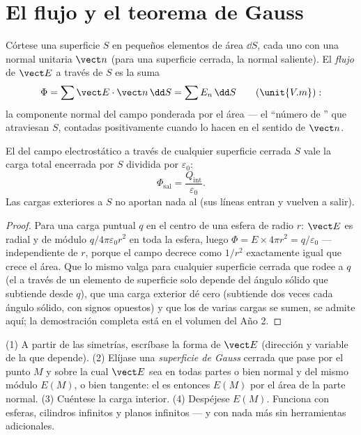 \section{El flujo y el teorema de Gauss}

\begin{definition}\label{def:b1:electrostatics-gauss:flux}
Córtese una superficie $S$ en pequeños elementos de área $\dd S$, cada uno
con una normal unitaria $\vect n$ (para una superficie cerrada, la normal
saliente). El \emph{flujo} de $\vect E$ a través de $S$ es la suma
\[
\Phi = \sum \vect E\cdot\vect n\,\dd S = \sum E_n\,\dd S \qquad (\unit{V.m}):
\]
la componente normal del campo ponderada por el área --- el ``número de
'' que atraviesan $S$, contadas positivamente cuando lo
hacen en el sentido de $\vect n$.
\end{definition}

\begin{theorem}\label{thm:b1:electrostatics-gauss:gauss}
El  del campo electrostático a través de cualquier superficie cerrada
$S$ vale la carga total encerrada por $S$ dividida por $\varepsilon_0$:
\[
\Phi_{\text{sal}} = \frac{Q_{\text{int}}}{\varepsilon_0} .
\]
Las cargas exteriores a $S$ no aportan nada al  (sus líneas entran y
vuelven a salir).
\end{theorem}

\begin{proof}
Para una carga puntual $q$ en el centro de una esfera de radio $r$:
$\vect E$ es radial y de módulo $q/4\pi\varepsilon_0r^2$ en toda la esfera, luego
$\Phi = E \times 4\pi r^2 = q/\varepsilon_0$ --- independiente de $r$, porque el
campo decrece como $1/r^2$ exactamente igual que crece el área. Que lo
mismo valga para cualquier superficie cerrada que rodee a $q$ (el  a
través de un elemento de superficie solo depende del ángulo sólido que
subtiende desde $q$), que una carga exterior dé cero (subtiende dos veces
cada ángulo sólido, con signos opuestos) y que los  de varias cargas
se sumen, se admite aquí; la demostración completa está en el volumen del Año 2.
\end{proof}

\begin{method}\label{meth:b1:electrostatics-gauss:gauss}
(1) A partir de las simetrías, escríbase la forma de $\vect E$ (dirección
y variable de la que depende). (2) Elíjase una \emph{superficie de Gauss}
cerrada que pase por el punto $M$ y sobre la cual $\vect E$ sea en todas
partes o bien normal y del mismo módulo $E(M)$, o bien tangente: el 
es entonces $E(M)$ por el área de la parte normal. (3) Cuéntese la carga
interior. (4) Despéjese $E(M)$. Funciona con esferas, cilindros infinitos
y planos infinitos --- y con nada más sin herramientas adicionales.
\end{method}

